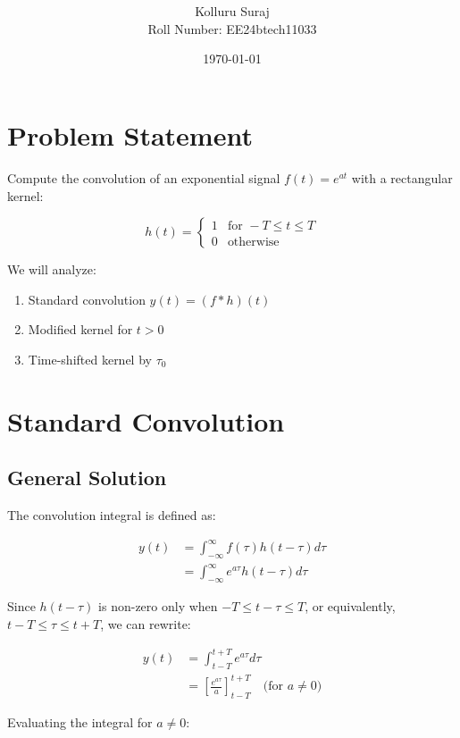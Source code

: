 \documentclass[12pt,a4paper,titlepage]{article}
\title{\textbf{ }}
\author{
    Kolluru Suraj \\
    Roll Number: EE24btech11033
}
\date{\today}
\begin{document}
\maketitle

\section{Problem Statement}
Compute the convolution of an exponential signal $f(t) = e^{at}$ with a rectangular kernel:

\begin{equation}
h(t) = 
\begin{cases} 
1 & \text{for } -T \leq t \leq T \\
0 & \text{otherwise}
\end{cases}
\end{equation}

We will analyze:
\begin{enumerate}
    \item Standard convolution $y(t) = (f*h)(t)$
    \item Modified kernel for $t > 0$
    \item Time-shifted kernel by $\tau_0$
\end{enumerate}

\section{Standard Convolution}
\subsection{General Solution}
The convolution integral is defined as:

\begin{align}
y(t) &= \int_{-\infty}^{\infty} f(\tau)h(t-\tau)d\tau \\
&= \int_{-\infty}^{\infty} e^{a\tau}h(t-\tau)d\tau
\end{align}

Since $h(t-\tau)$ is non-zero only when $-T \leq t-\tau \leq T$, or equivalently, $t-T \leq \tau \leq t+T$, we can rewrite:

\begin{align}
y(t) &= \int_{t-T}^{t+T} e^{a\tau}d\tau \\
&= \left[ \frac{e^{a\tau}}{a} \right]_{t-T}^{t+T} \quad \text{(for $a \neq 0$)}
\end{align}

Evaluating the integral for $a \neq 0$:
\end{document}
